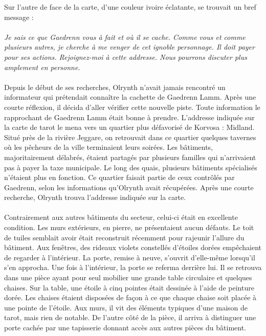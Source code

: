 \documentclass[main.tex]{subfiles}
\begin{document}
   Sur l'autre de face de la carte, d'une couleur ivoire éclatante, se trouvait un bref message :\\
   \\
   \textit{
       Je sais ce que Gaedrenn vous à fait et où il se cache.
       Comme vous et comme plusieurs autres, je cherche à me venger de cet ignoble personnage.
       Il doit payer pour ses actions.
       Rejoignez-moi à cette addresse.
       Nous pourrons discuter plus amplement en personne.
   }\\
   \\
   Depuis le début de ses recherches, Olrynth n'avait jamais rencontré un informateur qui prétendait connaître la cachette de Gaedrenn Lamm.
   Après une courte réflexion, il décida d'aller vérifier cette nouvelle piste.
   Toute information le rapprochant de Gaedrenn Lamm était bonne à prendre.
   L'addresse indiquée sur la carte de tarot le mena vers un quartier plus défavorisé de Korvosa : Midland.
   Situé près de la rivière Jeggare, on retrouvait dans ce quartier quelques tavernes où les pêcheurs de la ville terminaient leurs soirées.
   Les bâtiments, majoritairement délabrés, étaient partagés par plusieurs familles qui n'arrivaient pas à payer la taxe municipale.
   Le long des quais, plusieurs bâtiments spécialisés n'étaient plus en fonction.
   Ce quartier faisait partie de ceux contrôlés par Gaedrenn, selon les informations qu'Olrynth avait récupérées.
   Après une courte recherche, Olrynth trouva l'addresse indiquée sur la carte.\\
   \\
   Contrairement aux autres bâtiments du secteur, celui-ci était en excellente condition.
   Les murs extérieurs, en pierre, ne présentaient aucun défauts.
   Le toit de tuiles semblait avoir était reconstruit récemment pour rajeunir l'allure du bâtiment.
   Aux fenêtres, des rideaux violets constellés d'étoiles dorées empêchaient de regarder à l'intérieur.
   La porte, remise à neuve, s'ouvrit d'elle-même lorsqu'il s'en approcha.
   Une fois à l'intérieur, la porte se referma derrière lui.
   Il se retrouva dans une pièce ayant pour seul mobilier une grande table circulaire et quelques chaises.
   Sur la table, une étoile à cinq pointes était dessinée à l'aide de peinture dorée.
   Les chaises étaient disposées de façon à ce que chaque chaise soit placée à une pointe de l'étoile.
   Aux murs, il vit des éléments typiques d'une maison de tarot, mais rien de notable.
   De l'autre côté de la pièce, il arriva à distinguer une porte cachée par une tapisserie donnant accès aux autres pièces du bâtiment.\\
\end{document}
